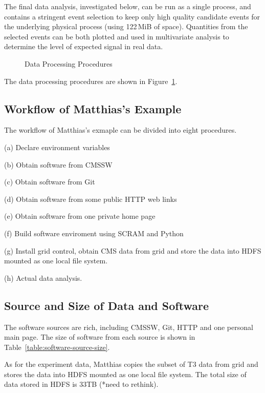 \documentclass{acm_proc_article-sp}
\begin{document}
The final data analysis, investigated below, can be run as a single
process, and contains a stringent event selection to keep only high
quality candidate events for the underlying physical process (using
122$\,$MiB of space).  Quantities from the selected events can be
both plotted and used in multivariate analysis to determine the level
of expected signal in real data.

\begin{figure}
\centering
{}
\caption{Data Processing Procedures}
\label{fig:data-process}
\end{figure}

The data processing procedures are shown in Figure~\ref{fig:data-process}.


\subsection{Workflow of Matthias's Example}

The workflow of Matthias's exmaple can be divided into eight procedures.

(a) Declare environment variables

(b) Obtain software from CMSSW

(c) Obtain software from Git

(d) Obtain software from some public HTTP web links

(e) Obtain software from one private home page

(f) Build software enviroment using SCRAM and Python

(g) Install grid control, obtain CMS data from grid and store the data into HDFS mounted as one local file system.

(h) Actual data analysis.

\subsection{Source and Size of Data and Software}

The software sources are rich, including CMSSW, Git, HTTP and one personal main page. The size of software from each source is shown in Table~\ref{table:software-source-size}.

As for the experiment data, Matthias copies the subset of T3 data from grid and stores the data into HDFS mounted as one local file system. The total size of data stored in HDFS is 33TB (*need to rethink).
\end{document}
